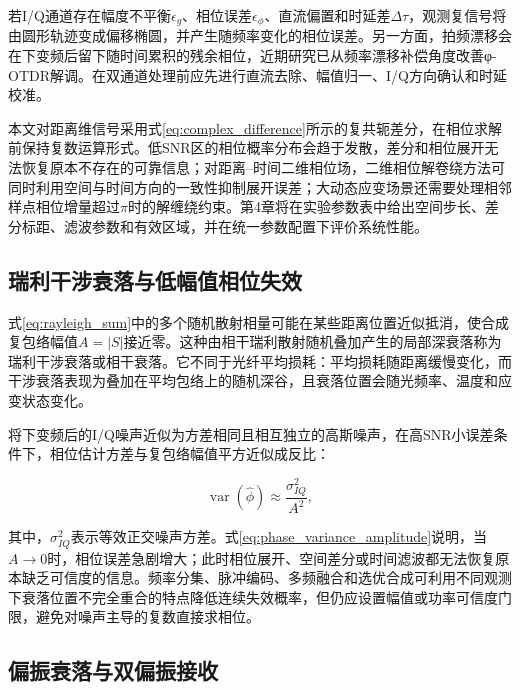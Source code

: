 若I/Q通道存在幅度不平衡$\epsilon_g$、相位误差$\epsilon_\phi$、直流偏置和时延差$\Delta\tau$，观测复信号将由圆形轨迹变成偏移椭圆，并产生随频率变化的相位误差。另一方面，拍频漂移会在下变频后留下随时间累积的残余相位，近期研究已从频率漂移补偿角度改善φ-OTDR解调\cite{zhao2024frequency}。在双通道处理前应先进行直流去除、幅值归一、I/Q方向确认和时延校准。

本文对距离维信号采用式\eqref{eq:complex_difference}所示的复共轭差分，在相位求解前保持复数运算形式。低SNR区的相位概率分布会趋于发散，差分和相位展开无法恢复原本不存在的可靠信息\cite{lu2021detection,lu2022phaseerror,lu2023phase}；对距离--时间二维相位场，二维相位解卷绕方法可同时利用空间与时间方向的一致性抑制展开误差\cite{sun2024unwrapping_thesis}；大动态应变场景还需要处理相邻样点相位增量超过$\pi$时的解缠绕约束\cite{ran2025dynamic_thesis}。第4章将在实验参数表中给出空间步长、差分标距、滤波参数和有效区域，并在统一参数配置下评价系统性能。

\subsection{瑞利干涉衰落与低幅值相位失效}

式\eqref{eq:rayleigh_sum}中的多个随机散射相量可能在某些距离位置近似抵消，使合成复包络幅值$A=|S|$接近零。这种由相干瑞利散射随机叠加产生的局部深衰落称为瑞利干涉衰落或相干衰落。它不同于光纤平均损耗：平均损耗随距离缓慢变化，而干涉衰落表现为叠加在平均包络上的随机深谷，且衰落位置会随光频率、温度和应变状态变化\cite{tu2020fading,cheng2023subband,cui2021interference,lei2025fading_cn,shan2019key_thesis}。

将下变频后的I/Q噪声近似为方差相同且相互独立的高斯噪声，在高SNR小误差条件下，相位估计方差与复包络幅值平方近似成反比：

\begin{equation}
\operatorname{var}(\hat\phi)
\approx
\frac{\sigma_{IQ}^2}{A^2},
\label{eq:phase_variance_amplitude}
\end{equation}

其中，$\sigma_{IQ}^2$表示等效正交噪声方差。式\eqref{eq:phase_variance_amplitude}说明，当$A\rightarrow0$时，相位误差急剧增大；此时相位展开、空间差分或时间滤波都无法恢复原本缺乏可信度的信息。频率分集、脉冲编码、多频融合和选优合成可利用不同观测下衰落位置不完全重合的特点降低连续失效概率，但仍应设置幅值或功率可信度门限，避免对噪声主导的复数直接求相位。

\subsection{偏振衰落与双偏振接收}

